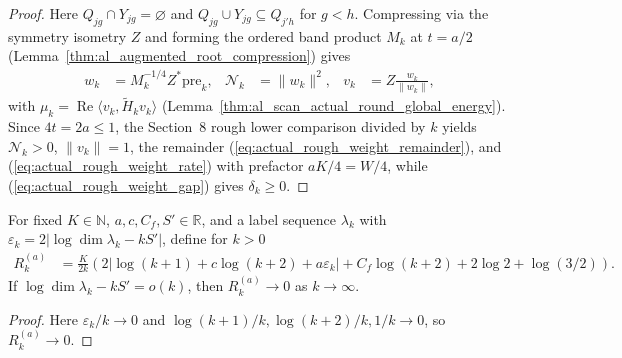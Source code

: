 \begin{proof}
    \leanok
    Here $Q_{jg}\cap Y_{jg}=\varnothing$ and $Q_{jg}\cup Y_{jg}\subseteq Q_{j'h}$
    for $g<h$. Compressing via the symmetry isometry $Z$ and forming the
    ordered band product $M_k$ at $t=a/2$ (Lemma~\ref{thm:al_augmented_root_compression})
    gives
    \begin{align}
        w_k & =M_k^{-1/4}Z^*\mathrm{pre}_k,
            & \mathcal N_k                  & =\|w_k\|^2,
            & v_k                           & =Z\frac{w_k}{\|w_k\|},
        \label{eq:actual_rough_lower_coordinates}
    \end{align}
    with $\mu_k=\operatorname{Re}\langle v_k,\widetilde H_kv_k\rangle$
    (Lemma~\ref{thm:al_scan_actual_round_global_energy}). Since $4t=2a\leq1$,
    the Section~8 rough lower comparison divided by $k$ yields $\mathcal N_k>0$,
    $\|v_k\|=1$, the remainder (\ref{eq:actual_rough_weight_remainder}), and
    (\ref{eq:actual_rough_weight_rate}) with prefactor $aK/4=W/4$, while
    (\ref{eq:actual_rough_weight_gap}) gives $\delta_k\geq0$.
\end{proof}

\begin{lemma}
    \label{thm:actual_rough_weight_remainder_limit}
    \leanok
    For fixed $K\in\mathbb N$, $a,c,C_f,S'\in\mathbb R$, and a label sequence
    $\lambda_k$ with $\varepsilon_k=2|\log\dim\lambda_k-kS'|$, define for $k>0$
    \begin{align}
        R_k^{(a)}
         & =\frac{K}{2k}\left(
        2|\log(k+1)+c\log(k+2)+a\varepsilon_k|
        +C_f\log(k+2)+2\log2+\log(3/2)\right).
        \label{eq:actual_rough_weight_label_remainder}
    \end{align}
    If $\log\dim\lambda_k-kS'=o(k)$, then $R_k^{(a)}\to0$ as $k\to\infty$.
\end{lemma}
\begin{proof}
    \leanok
    Here $\varepsilon_k/k\to0$ and $\log(k+1)/k,\log(k+2)/k,1/k\to0$, so
    $R_k^{(a)}\to0$.
\end{proof}

